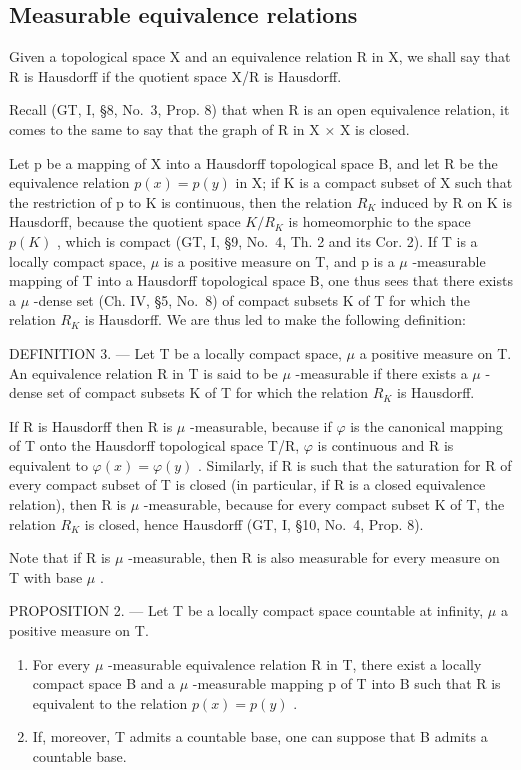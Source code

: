 \subsection{Measurable equivalence relations}

Given a topological space X and an equivalence relation R in X, we shall say that R is Hausdorff if the quotient space X/R is Hausdorff.

Recall (GT, I, §8, No.~3, Prop. 8) that when R is an open equivalence relation, it comes to the same to say that the graph of R in X × X is closed.

Let p be a mapping of X into a Hausdorff topological space B, and let R be the equivalence relation \(p(x) = p(y)\) in X; if K is a compact subset of X such that the restriction of p to K is continuous, then the relation \(R_{K}\) induced by R on K is Hausdorff, because the quotient space \(K/R_{K}\) is homeomorphic to the space \(p(K)\) , which is compact (GT, I, §9, No.~4, Th. 2 and its Cor. 2). If T is a locally compact space, \(\mu\) is a positive measure on T, and p is a \(\mu\) -measurable mapping of T into a Hausdorff topological space B, one thus sees that there exists a \(\mu\) -dense set (Ch. IV, §5, No.~8) of compact subsets K of T for which the relation \(R_{K}\) is Hausdorff. We are thus led to make the following definition:

DEFINITION 3. --- Let T be a locally compact space, \(\mu\) a positive measure on T. An equivalence relation R in T is said to be \(\mu\) -measurable if there exists a \(\mu\) -dense set of compact subsets K of T for which the relation \(R_{K}\) is Hausdorff.

If R is Hausdorff then R is \(\mu\) -measurable, because if \(\varphi\) is the canonical mapping of T onto the Hausdorff topological space T/R, \(\varphi\) is continuous and R is equivalent to \(\varphi(x)=\varphi(y)\) . Similarly, if R is such that the saturation for R of every compact subset of T is closed (in particular, if R is a closed equivalence relation), then R is \(\mu\) -measurable, because for every compact subset K of T, the relation \(R_{K}\) is closed, hence Hausdorff (GT, I, §10, No.~4, Prop. 8).

Note that if R is \(\mu\) -measurable, then R is also measurable for every measure on T with base \(\mu\) .

PROPOSITION 2. --- Let T be a locally compact space countable at infinity, \(\mu\) a positive measure on T.

\begin{enumerate}
\def\labelenumi{\arabic{enumi})}
\item
  For every \(\mu\) -measurable equivalence relation R in T, there exist a locally compact space B and a \(\mu\) -measurable mapping p of T into B such that R is equivalent to the relation \(p(x) = p(y)\) .
\item
  If, moreover, T admits a countable base, one can suppose that B admits a countable base.
\end{enumerate}

